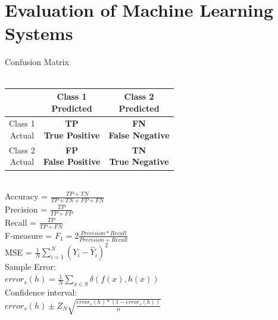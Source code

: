 \documentclass[a4paper, 10pt, twocolumn]{article}
\begin{document}
\section{Evaluation of Machine Learning Systems}
Confusion Matrix \\ \\
\begin{tabular} {| c | c | c |}
	\hline
 & \thead{Class 1 \\ Predicted} & \thead{Class 2 \\ Predicted} \\
 \hline
 \thead{Class 1 \\ Actual} &  \thead{\bf TP \\ True Positive} & \thead{\bf FN \\False Negative} \\
 \hline
 \thead{Class 2 \\ Actual} &  \thead{\bf FP \\ False Positive} & \thead{\bf TN \\ True Negative} \\
 \hline
\end{tabular} \\
Accuracy = $\frac{TP + TN}{TP + TN + FP + FN}$ \\ 
Precision = $\frac{TP}{TP + FP}$ \\
Recall = $\frac{TP}{TP + FN}$ \\
F-measure = $F_1 = 2\frac{Precision*Recall}{Precision + Recall}$\\
MSE = $\frac{1}{N} \sum^{N}_{i=1}(Y_i - \hat{Y}_i)^2$\\
Sample Error: \\$error_s(h) = \frac{1}{N} \sum_{x \in S} \delta (f(x),h(x))$\\
Confidence interval: \\ $error_s(h) \pm Z_N \sqrt{\frac{error_s(h)*(1-error_s(h))}{n}}$
\end{document}

